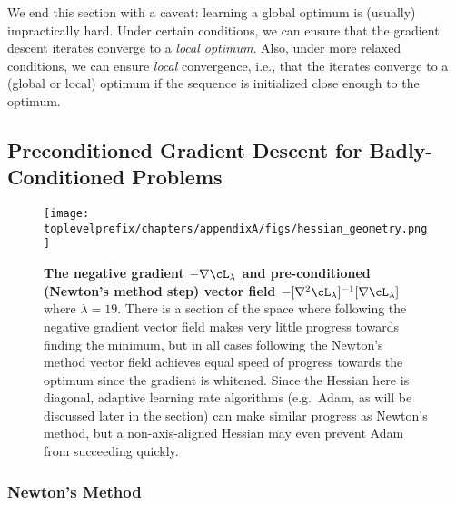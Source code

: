 \documentclass[../../book-main.tex]{subfiles}
\begin{document}
We end this section with a caveat: learning a global optimum is (usually) impractically hard. Under certain conditions, we can ensure that the gradient descent iterates converge to a \textit{local optimum}. Also, under more relaxed conditions, we can ensure \textit{local} convergence, i.e., that the iterates converge to a (global or local) optimum if the sequence is initialized close enough to the optimum.



\subsection{Preconditioned Gradient Descent for Badly-Conditioned Problems}


\begin{figure}
    \texttt{[image: \\toplevelprefix/chapters/appendixA/figs/hessian\_geometry.png]}
    \caption{\small\textbf{The negative gradient \(-\nabla \cL_{\lambda}\) and pre-conditioned (Newton's method step) vector field \(-[\nabla^{2}\cL_{\lambda}]^{-1}[\nabla \cL_{\lambda}]\)} where \(\lambda = 19\). There is a section of the space where following the negative gradient vector field makes very little progress towards finding the minimum, but in all cases following the Newton's method vector field achieves equal speed of progress towards the optimum since the gradient is whitened. Since the Hessian here is diagonal, adaptive learning rate algorithms (e.g.~Adam, as will be discussed later in the section) can make similar progress as Newton's method, but a non-axis-aligned Hessian may even prevent Adam from succeeding quickly.}
    \label{fig:hessian_geometry}
\end{figure}

\subsubsection{Newton's Method}
\end{document}
